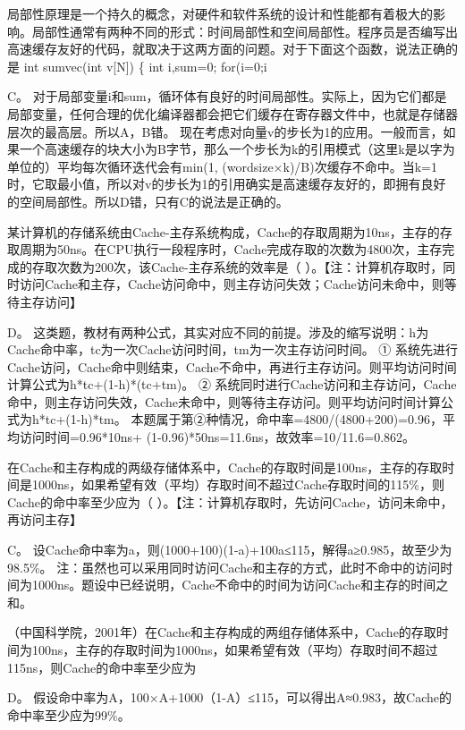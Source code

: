 \question 局部性原理是一个持久的概念，对硬件和软件系统的设计和性能都有着极大的影响。局部性通常有两种不同的形式：时间局部性和空间局部性。程序员是否编写出高速缓存友好的代码，就取决于这两方面的问题。对于下面这个函数，说法正确的是
int sumvec(int v{[}N{]}) \{ int i,sum=0; for(i=0;i
\par{}
\begin{solution}C。
对于局部变量i和sum，循环体有良好的时间局部性。实际上，因为它们都是局部变量，任何合理的优化编译器都会把它们缓存在寄存器文件中，也就是存储器层次的最高层。所以A，B错。
现在考虑对向量v的步长为1的应用。一般而言，如果一个高速缓存的块大小为B字节，那么一个步长为k的引用模式（这里k是以字为单位的）平均每次循环迭代会有min(1,
(wordsize×k)/B)次缓存不命中。当k=1时，它取最小值，所以对v的步长为1的引用确实是高速缓存友好的，即拥有良好的空间局部性。所以D错，只有C的说法是正确的。
\end{solution}
\question 某计算机的存储系统由Cache-主存系统构成，Cache的存取周期为10ns，主存的存取周期为50ns。在CPU执行一段程序时，Cache完成存取的次数为4800次，主存完成的存取次数为200次，该Cache-主存系统的效率是（
）。【注：计算机存取时，同时访问Cache和主存，Cache访问命中，则主存访问失效；Cache访问未命中，则等待主存访问】
\par{}
\begin{solution}D。
这类题，教材有两种公式，其实对应不同的前提。涉及的缩写说明：h为Cache命中率，tc为一次Cache访问时间，tm为一次主存访问时间。
①
系统先进行Cache访问，Cache命中则结束，Cache不命中，再进行主存访问。则平均访问时间计算公式为h*tc+(1-h)*(tc+tm)。
②
系统同时进行Cache访问和主存访问，Cache命中，则主存访问失效，Cache未命中，则等待主存访问。则平均访问时间计算公式为h*tc+(1-h)*tm。
本题属于第②种情况，命中率=4800/(4800+200)=0.96，平均访问时间=0.96*10ns+
(1-0.96)*50ns=11.6ns，故效率=10/11.6=0.862。
\end{solution}
\question 在Cache和主存构成的两级存储体系中，Cache的存取时间是100ns，主存的存取时间是1000ns，如果希望有效（平均）存取时间不超过Cache存取时间的115\%，则Cache的命中率至少应为（
）。【注：计算机存取时，先访问Cache，访问未命中，再访问主存】
\par{}
\begin{solution}C。
设Cache命中率为a，则(1000+100)(1-a)+100a≤115，解得a≥0.985，故至少为98.5\%。
注：虽然也可以采用同时访问Cache和主存的方式，此时不命中的访问时间为1000ns。题设中已经说明，Cache不命中的时间为访问Cache和主存的时间之和。
\end{solution}
\question （中国科学院，2001年）在Cache和主存构成的两组存储体系中，Cache的存取时间为100ns，主存的存取时间为1000ns，如果希望有效（平均）存取时间不超过115ns，则Cache的命中率至少应为
\par{}
\begin{solution}D。
假设命中率为A，100×A+1000（1-A）≤115，可以得出A≈0.983，故Cache的命中率至少应为99\%。
\end{solution}
